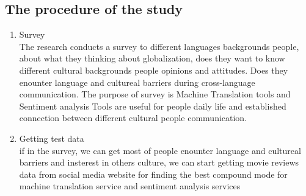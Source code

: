 \documentclass[conference]{IEEEtran}
\begin{document}
\subsection{The procedure of the study}
\begin{enumerate}
\item {Survey} \\
  The research conducts a survey to different languages backgrounds people,
  about what they thinking about globalization, does they want to know different
  cultural backgrounds people opinions and attitudes. Does they enounter language and cultureal barriers during cross-language
communication. The purpose of survey is Machine Translation tools and Sentiment
analysis Tools are useful for people daily life and established connection
between different cultural people communication.
\item{Getting test data}\\
  if in the survey, we can get most of people enounter language and
  cultureal barriers and insterest in others culture, we can start getting movie
  reviews data from social media website for finding the best compound mode for machine translation service and
  sentiment analysis services


\end{enumerate}
\end{document}

